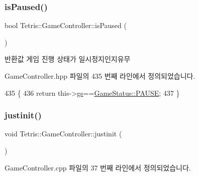 \subsubsection{\texorpdfstring{is\+Paused()}{isPaused()}\hspace{0.1cm}{\footnotesize\ttfamily [2/2]}}
{\footnotesize\ttfamily bool Tetris\+::\+Game\+Controller\+::is\+Paused (\begin{DoxyParamCaption}{ }\end{DoxyParamCaption})\hspace{0.3cm}{\ttfamily [inline]}}

\begin{DoxyReturn}{반환값}
게임 진행 상태가 일시정지인지유무 
\end{DoxyReturn}


Game\+Controller.\+hpp 파일의 435 번째 라인에서 정의되었습니다.


\begin{DoxyCode}
435                            \{
436                 \textcolor{keywordflow}{return} this->\hyperlink{class_tetris_1_1_game_controller_ae4c894005a82404c73a5a9a6efb208dc}{gs}==\hyperlink{class_tetris_1_1_game_controller_a96a963b56385f3b3a122ff0ca2beb770a291554596c183e837f0a6bec3767c891}{GameStatus::PAUSE};
437             \}
\end{DoxyCode}
\mbox{\label{class_tetris_1_1_game_controller_aef406397d4719c9edd49774d0343ce05}} 
\subsubsection{\texorpdfstring{justinit()}{justinit()}\hspace{0.1cm}{\footnotesize\ttfamily [1/2]}}
{\footnotesize\ttfamily void Tetris\+::\+Game\+Controller\+::justinit (\begin{DoxyParamCaption}{ }\end{DoxyParamCaption})}



Game\+Controller.\+cpp 파일의 37 번째 라인에서 정의되었습니다.


